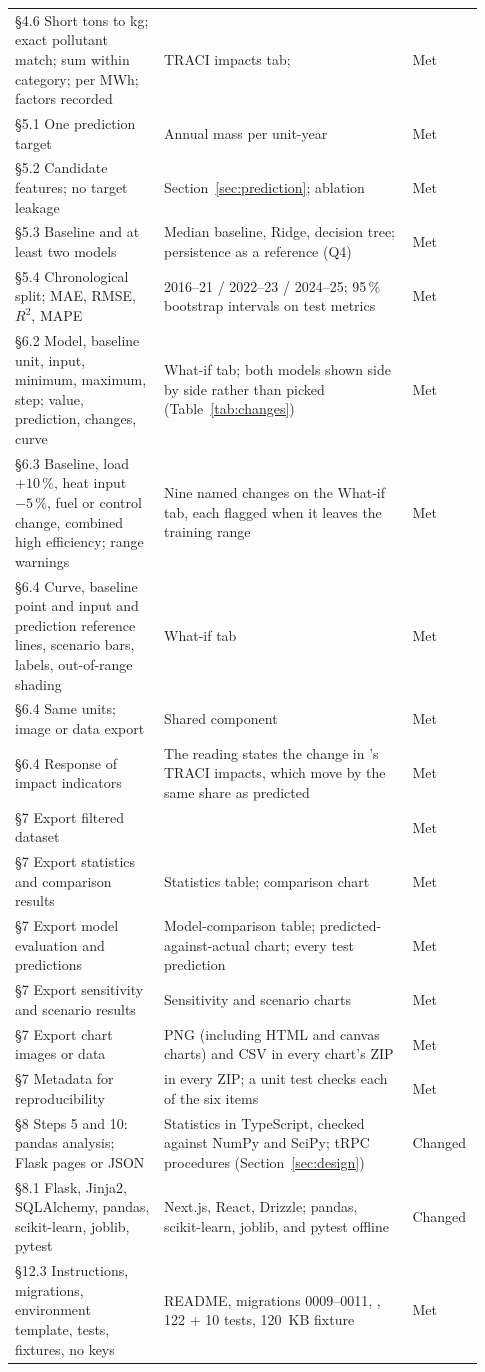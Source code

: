 \documentclass[11pt,a4paper]{article}
\begin{document}
{\begin{longtable}{@{}R{0.3\linewidth}R{0.5\linewidth}R{0.13\linewidth}@{}}
\S4.6 Short tons to kg; exact pollutant match; sum within category; per MWh; factors recorded & TRACI impacts tab;  & Met\\
\S5.1 One prediction target & Annual \NOx{} mass per unit-year & Met\\
\S5.2 Candidate features; no target leakage & Section~\ref{sec:prediction}; ablation & Met\\
\S5.3 Baseline and at least two models & Median baseline, Ridge, decision tree; persistence as a reference (Q4) & Met\\
\S5.4 Chronological split; MAE, RMSE, $R^2$, MAPE & 2016--21 / 2022--23 / 2024--25; 95\,\% bootstrap intervals on test metrics & Met\\
\S6.2 Model, baseline unit, input, minimum, maximum, step; value, prediction, changes, curve & What-if tab; both models shown side by side rather than picked (Table~\ref{tab:changes}) & Met\\
\S6.3 Baseline, load $+10\,\%$, heat input $-5\,\%$, fuel or control change, combined high efficiency; range warnings & Nine named changes on the What-if tab, each flagged when it leaves the training range & Met\\
\S6.4 Curve, baseline point and input and prediction reference lines, scenario bars, labels, out-of-range shading & What-if tab & Met\\
\S6.4 Same units; image or data export & Shared  component & Met\\
\S6.4 Response of impact indicators & The reading states the change in \NOx{}'s TRACI impacts, which move by the same share as predicted \NOx{} & Met\\
\S7 Export filtered dataset &  & Met\\
\S7 Export statistics and comparison results & Statistics table; comparison chart & Met\\
\S7 Export model evaluation and predictions & Model-comparison table; predicted-against-actual chart; every test prediction & Met\\
\S7 Export sensitivity and scenario results & Sensitivity and scenario charts & Met\\
\S7 Export chart images or data & PNG (including HTML and canvas charts) and CSV in every chart's ZIP & Met\\
\S7 Metadata for reproducibility &  in every ZIP; a unit test checks each of the six items & Met\\
\S8 Steps 5 and 10: pandas analysis; Flask pages or JSON & Statistics in TypeScript, checked against NumPy and SciPy; tRPC procedures (Section~\ref{sec:design}) & Changed\\
\S8.1 Flask, Jinja2, SQLAlchemy, pandas, scikit-learn, joblib, pytest & Next.js, React, Drizzle; pandas, scikit-learn, joblib, and pytest offline & Changed\\
\S12.3 Instructions, migrations, environment template, tests, fixtures, no keys & README, migrations 0009--0011, , 122 + 10 tests, 120~KB fixture & Met\\
\bottomrule
\end{longtable}}
\end{document}
